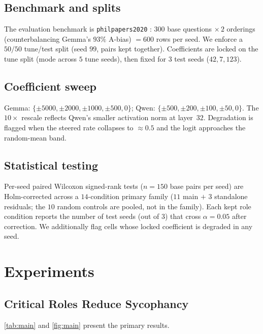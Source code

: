 \documentclass{article}
\theoremstyle{plain}
\theoremstyle{definition}
\theoremstyle{remark}
\begin{document}
\subsection{Benchmark and splits}
The evaluation benchmark is \texttt{philpapers2020} \cite{perez2022}: $300$ base questions $\times\,2$ orderings (counterbalancing Gemma's $93\%$ A-bias) $= 600$ rows per seed. We enforce a $50/50$ tune/test split (seed $99$, pairs kept together). Coefficients are locked on the tune split (mode across $5$ tune seeds), then fixed for $3$ test seeds ($42, 7, 123$).

\subsection{Coefficient sweep}
Gemma: $\{\pm 5000, \pm 2000, \pm 1000, \pm 500, 0\}$; Qwen: $\{\pm 500, \pm 200, \pm 100, \pm 50, 0\}$. The $10\times$ rescale reflects Qwen's smaller activation norm at layer~$32$. Degradation is flagged when the steered rate collapses to $\approx 0.5$ and the logit approaches the random-mean band.

\subsection{Statistical testing}
Per-seed paired Wilcoxon signed-rank tests ($n=150$ base pairs per seed) are Holm-corrected across a $14$-condition primary family ($11$ main $+$ $3$ standalone residuals; the $10$ random controls are pooled, not in the family). Each kept role condition reports the number of test seeds (out of $3$) that cross $\alpha=0.05$ after correction. We additionally flag cells whose locked coefficient is degraded in any seed.

\section{Experiments}\label{sec:experiments}

\subsection{Critical Roles Reduce Sycophancy}
\label{sec:results-critical}

\cref{tab:main} and \cref{fig:main} present the primary results.
\end{document}

